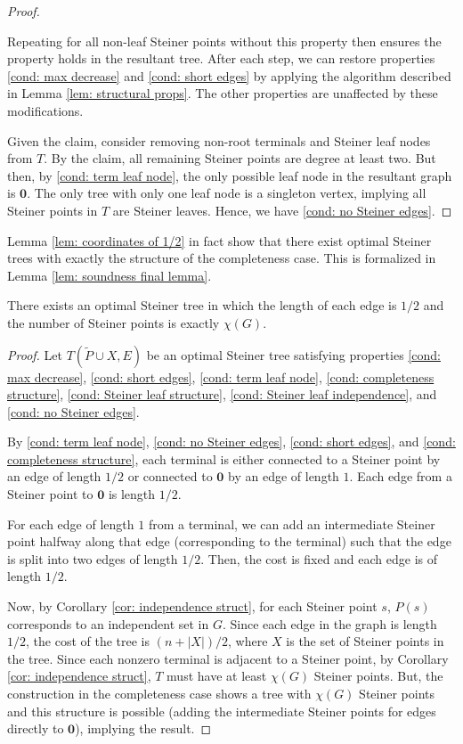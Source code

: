 \documentclass{article}\providecommand{\DeclareRedundantLanguages}[2]{}\usepackage[a4paper,margin=20mm]{geometry}
\newcommand{\1}{\textbf{1}}
\renewcommand{\tilde}{\widetilde}
\begin{document}
\begin{proof}
\begin{subproof}
Repeating for all non-leaf Steiner points without this property then ensures the property holds in the resultant tree. After each step, we can restore properties \ref{cond: max decrease} and \ref{cond: short edges} by applying the algorithm described in Lemma \ref{lem: structural props}. The other properties are unaffected by these modifications.
\end{subproof}
Given the claim, consider removing non-root terminals and Steiner leaf nodes from $T$. By the claim, all remaining Steiner points are degree at least two. But then, by \ref{cond: term leaf node}, the only possible leaf node in the resultant graph is $\mathbf{0}$. The only tree with only one leaf node is a singleton vertex, implying all Steiner points in $T$ are Steiner leaves. Hence, we have \ref{cond: no Steiner edges}.
\end{proof}

Lemma \ref{lem: coordinates of 1/2} in fact show that there exist optimal Steiner trees with exactly the structure of the completeness case. This is formalized in Lemma \ref{lem: soundness final lemma}.
\begin{lemma} \label{lem: soundness final lemma}
There exists an optimal Steiner tree in which the length of each edge is $1/2$ and the number of Steiner points is exactly $\chi(G)$.
\end{lemma}
\begin{proof}
Let $T(\tilde{P} \cup X, E)$ be an optimal Steiner tree satisfying properties \ref{cond: max decrease}, \ref{cond: short edges}, \ref{cond: term leaf node}, \ref{cond: completeness structure}, \ref{cond: Steiner leaf structure}, \ref{cond: Steiner leaf independence}, and \ref{cond: no Steiner edges}. 

By \ref{cond: term leaf node}, \ref{cond: no Steiner edges}, \ref{cond: short edges}, and \ref{cond: completeness structure}, each terminal is either connected to a Steiner point by an edge of length $1/2$ or connected to $\mathbf{0}$ by an edge of length $1$. Each edge from a Steiner point to $\mathbf{0}$ is length $1/2$. 

 For each edge of length $1$ from a terminal, we can add an intermediate Steiner point halfway along that edge (corresponding to the terminal) such that the edge is split into two edges of length $1/2$. Then, the cost is fixed and each edge is of length $1/2$.

Now, by Corollary \ref{cor: independence struct}, for each Steiner point $s$, $P(s)$ corresponds to an independent set in $G$. Since each edge in the graph is length $1/2$, the cost of the tree is $(n + |X|)/2$, where $X$ is the set of Steiner points in the tree. Since each nonzero terminal is adjacent to a Steiner point, by Corollary \ref{cor: independence struct}, $T$ must have at least $\chi(G)$ Steiner points. But, the construction in the completeness case shows a tree with $\chi(G)$ Steiner points and this structure is possible (adding the intermediate Steiner points for edges directly to $\mathbf{0}$), implying the result.
\end{proof}
\end{document}
